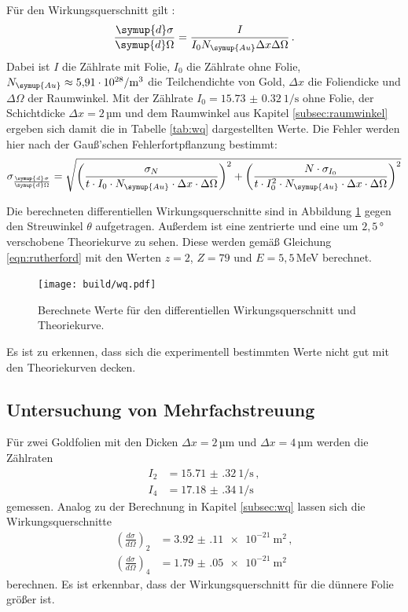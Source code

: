 Für den Wirkungsquerschnitt gilt \cite{wq}:
\begin{equation}
  \frac{\symup{d}\sigma}{\symup{d}\Omega} = \frac{I}{I_0  N_{\symup{Au}} \Delta x \Delta \Omega} \,.
  \label{eqn:wq}
\end{equation}
Dabei ist $I$ die Zählrate mit Folie, $I_0$ die Zählrate ohne Folie, $ N_{\symup{Au}} \approx \SI{5.91e28}{\per\cubic\metre}$
die Teilchendichte von Gold, $\Delta x$ die Foliendicke und $\Delta \Omega$ der Raumwinkel.
Mit der Zählrate $I_0=\SI{15.73(032)}{1 \per\second}$ ohne Folie, der Schichtdicke $\Delta x =2$\,µm und dem Raumwinkel
aus Kapitel \ref{subsec:raumwinkel} ergeben sich damit die in Tabelle \ref{tab:wq} dargestellten Werte.
Die Fehler werden hier nach der Gauß'schen Fehlerfortpflanzung bestimmt:
\begin{equation*}
  \sigma_{\frac{\symup{d}\sigma}{\symup{d}\Omega}} = \sqrt{\left(\frac{\sigma_N}{t \cdot I_0 \cdot N_{\symup{Au}} \cdot \Delta x \cdot \Delta \Omega}\right)^2
  + \left(\frac{N \cdot \sigma_{I_0}}{t \cdot I_0^2 \cdot N_{\symup{Au}} \cdot \Delta x \cdot \Delta \Omega}\right)^2}
\end{equation*}

Die berechneten differentiellen Wirkungsquerschnitte sind in Abbildung \ref{fig:wq} gegen den Streuwinkel $\theta$ aufgetragen. Außerdem ist
eine zentrierte und eine um $2{,}5$\,° verschobene Theoriekurve zu sehen.
Diese werden gemäß Gleichung \eqref{eqn:rutherford} mit den
Werten $z=2$, $Z=79$ und $E=5{,}5$\,MeV \cite{energie} berechnet.

\begin{figure}
  \centering
  \texttt{[image: build/wq.pdf]}
  \caption{Berechnete Werte für den differentiellen Wirkungsquerschnitt und Theoriekurve.}
  \label{fig:wq}
\end{figure}

Es ist zu erkennen, dass sich die experimentell bestimmten Werte nicht gut mit den Theoriekurven decken.

\subsection{Untersuchung von Mehrfachstreuung}
\label{subsec:mehrfach}

Für zwei Goldfolien mit den Dicken $\Delta x=2$\,µm und $\Delta x=4$\,µm werden
die Zählraten
\begin{align*}
  I_2&= \SI{15.71(32)}{1\per\second}\,,\\
  I_4&= \SI{17.18(34)}{1\per\second}
\end{align*}
gemessen. Analog zu der Berechnung in Kapitel \ref{subsec:wq} lassen sich die Wirkungsquerschnitte
\begin{align*}
  \left(\frac{d \sigma}{d \Omega}\right)_2&=\SI{3.92(11)e-21}{\metre\squared} \,, \\
  \left(\frac{d \sigma}{d \Omega}\right)_4&=\SI{1.79(05)e-21}{\metre\squared}
\end{align*}
berechnen. Es ist erkennbar, dass der Wirkungsquerschnitt für die dünnere Folie
größer ist.

